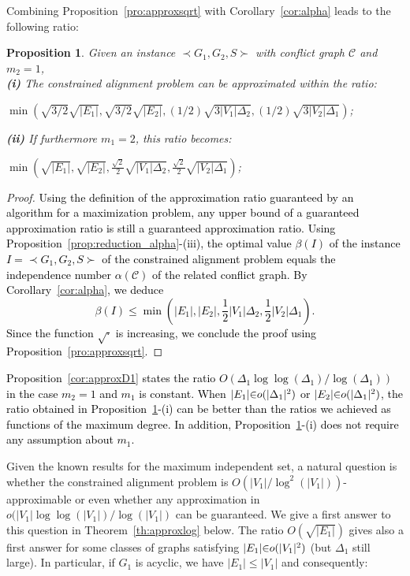 \documentclass[final]{dmtcs-episciences}
\newtheorem{proposition}[theorem]{Proposition}
\newcommand\mar[1]{\textcolor{black}{#1}}
\begin{document}
Combining Proposition~\ref{pro:approxsqrt} with Corollary~\ref{cor:alpha} leads to the following ratio:


\begin{proposition}\label{cor:approxalpha2}
Given an instance $\prec G_1,G_2,S \succ$ with conflict graph $\mathcal{C}$ and $m_2=1$,\\
{\bf{(i)}} The constrained alignment problem can be approximated within the ratio:\\
{\centerline{$\min \left(\sqrt{3/2}\sqrt{|E_1|},\sqrt{3/2}\sqrt{|E_2|}, (1/2)\sqrt{3|V_1|\Delta_2},(1/2)\sqrt{3|V_2|\Delta_1}\right)$;}}
{\bf{(ii)}} If furthermore $m_1=2$, this ratio becomes:\\{\centerline{$\min \left(\sqrt{|E_1|},\sqrt{|E_2|}, \frac{\sqrt{2}}{2}\sqrt{|V_1|\Delta_2},\frac{\sqrt{2}}{2}\sqrt{|V_2|\Delta_1}\right)$;}}
\end{proposition}
\begin{proof}
\mar{Using the definition of the approximation ratio guaranteed by an algorithm for a maximization problem, any upper bound of a guaranteed approximation ratio is still a guaranteed approximation ratio. Using Proposition~\ref{prop:reduction_alpha}-(iii), the optimal value $\beta(I)$ of the instance $I=\prec G_1,G_2,S \succ$ of the constrained alignment problem  equals the independence number $\alpha(\mathcal{C})$ of the related conflict graph. By Corollary~\ref{cor:alpha}, we deduce  
$$\beta(I)\leq \min \left(|E_1|,|E_2|, \frac{1}{2}|V_1|\Delta_2,\frac{1}{2}|V_2|\Delta_1\right).$$ 
Since the function $\sqrt{\cdot}$ is increasing, we conclude the proof using Proposition~\ref{pro:approxsqrt}.}
\end{proof}

\mar{Proposition~\ref{cor:approxD1} states the ratio $O(\Delta_1\log \log(\Delta_1)/\log(\Delta_1))$ in the case $m_2=1$ and $m_1$ is constant.
When $|E_1| \mar{\in} o(|\Delta_1|^2)$ or $|E_2|\mar{\in} o(|\Delta_1|^2)$, the ratio obtained in Proposition~\ref{cor:approxalpha2}-(i) can be better than the ratios we achieved  as functions of the maximum degree. In addition, Proposition~\ref{cor:approxalpha2}-(i) does not require any assumption about $m_1$. }

Given the known results for the maximum independent set, a natural question is whether the constrained alignment problem is $O(|V_1|/\log^2(|V_1|))$-approximable or even whether any approximation in $o(|V_1|\log\log(|V_1|)/\log(|V_1|)$ can be guaranteed. We give a first answer to this question in Theorem~\ref{th:approxlog} below.
The ratio $O(\sqrt{|E_1|})$ gives also a first answer for some classes of graphs satisfying $|E_1|\mar{\in} o(|V_1|^2)$ (but $\Delta_1$ still large). In particular, if $G_1$ is acyclic, we have $|E_1|\leq |V_1|$ and consequently:
\end{document}
